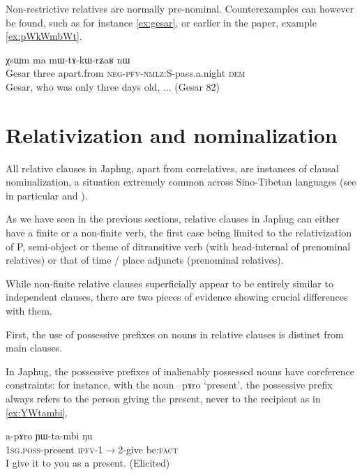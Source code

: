\documentclass[oldfontcommands,oneside,a4paper,11pt]{article}
\newcommand{\ipa}[1]{{\phon #1}} %
\newcommand{\topic}{\textsc{dem}}
\begin{document}
Non-restrictive relatives are normally pre-nominal. Counterexamples can however be found, such as  for instance \ref{ex:gesar}, or earlier in the paper, example \ref{ex:pWkWmbWt}.

\begin{exe}
   \ex  \label{ex:gesar}
\gll  \ipa{ʁlaŋsaŋtɕʰin}  	\ipa{χsɯm}  	\ipa{ma}  	\ipa{mɯ-tɤ-kɯ-rʑaʁ}  	\ipa{nɯ}     	\\
  Gesar three apart.from \textsc{neg-pfv-nmlz:S}-pass.a.night \topic{}   \\
 \glt  Gesar, who was only three days old, ... (Gesar 82)
   \end{exe} 



%


\section{Relativization and nominalization}

All relative clauses in Japhug, apart from correlatives, are instances of clausal nominalization, a situation extremely common across Sino-Tibetan languages (see in particular \citealt{genetti08nmlz} and \citealt{bickel99nmlz}).

As we have seen in the previous sections, relative clauses in Japhug can either have a finite or a non-finite verb, the first case being limited to the relativization of P, semi-object or theme of ditransitive verb (with head-internal of prenominal relatives) or that of time / place adjuncts (prenominal relatives). 

While non-finite relative clauses superficially appear to be entirely similar to independent clauses, there are two pieces of evidence showing crucial differences with them.

First, the use of possessive prefixes on nouns in relative clauses is distinct from main clauses.

In Japhug, the possessive prefixes of inalienably possessed nouns have coreference constraints: for instance, with the noun \ipa{--pɤro} `present', the possessive prefix always refers to the person giving the present, never to the recipient as in \ref{ex:YWtambi}. 
	
			\begin{exe}
\ex \label{ex:YWtambi}
\gll
	\ipa{a-pɤro}  	\ipa{ɲɯ-ta-mbi}  	\ipa{ŋu}  \\
	\textsc{1sg.poss}-present \textsc{ipfv}-1$\rightarrow$2-give be:\textsc{fact} \\
	\glt I give it to you as a present. (Elicited)
 	  \end{exe} 
	 
\end{document}
